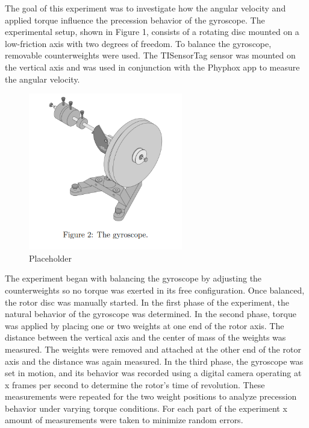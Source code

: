 The goal of this experiment was to investigate how the angular velocity and applied torque influence the precession behavior of the gyroscope. The experimental setup, shown in Figure 1, consists of a rotating disc mounted on a low-friction axis with two degrees of freedom. To balance the gyroscope, removable counterweights were used. The TISensorTag sensor was mounted on the vertical axis and was used in conjunction with the Phyphox app to measure the angular velocity.
\begin{figure}[h!]
    \centering
    \includegraphics[width=0.6\textwidth]{gyroscope/images/setup}
    \caption{Placeholder}
    \label{setep}
\end{figure}

The experiment began with balancing the gyroscope by adjusting the counterweights so no torque was exerted in its free configuration. Once balanced, the rotor disc was manually started. In the first phase of the experiment, the natural behavior of the gyroscope was determined.
In the second phase, torque was applied by placing one or two weights at one end of the rotor axis. The distance between the vertical axis and the center of mass of the weights was measured. The weights were removed and attached at the other end of the rotor axis and the distance was again measured. 
In the third phase, the gyroscope was set in motion, and its behavior was recorded using a digital camera operating at x frames per second to determine the rotor’s time of revolution. These measurements were repeated for the two weight positions to analyze precession behavior under varying torque conditions.
For each part of the experiment x amount of measurements were taken to minimize random errors.
